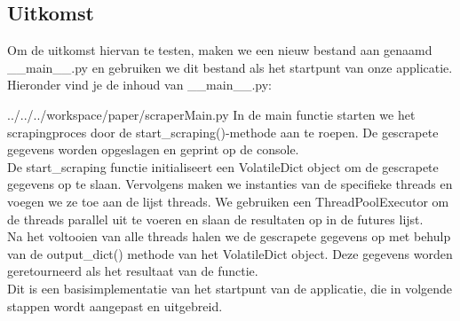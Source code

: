 \subsection{Uitkomst}
Om de uitkomst hiervan te testen, maken we een nieuw bestand aan genaamd \_\_main\_\_.py en gebruiken we dit bestand als het startpunt van onze applicatie. Hieronder vind je de inhoud van \_\_main\_\_.py:
\begin{pythoncode}{../../../workspace/paper/scraperMain.py}
In de main functie starten we het scrapingproces door de start\_scraping()-methode aan te roepen. De gescrapete gegevens worden opgeslagen en geprint op de console. \\

De start\_scraping functie initialiseert een VolatileDict object om de gescrapete gegevens op te slaan. Vervolgens maken we instanties van de specifieke threads en voegen we ze toe aan de lijst threads. We gebruiken een ThreadPoolExecutor om de threads parallel uit te voeren en slaan de resultaten op in de futures lijst. \\

Na het voltooien van alle threads halen we de gescrapete gegevens op met behulp van de output\_dict() methode van het VolatileDict object. Deze gegevens worden geretourneerd als het resultaat van de functie. \\

Dit is een basisimplementatie van het startpunt van de applicatie, die in volgende stappen wordt aangepast en uitgebreid.
\end{pythoncode}

